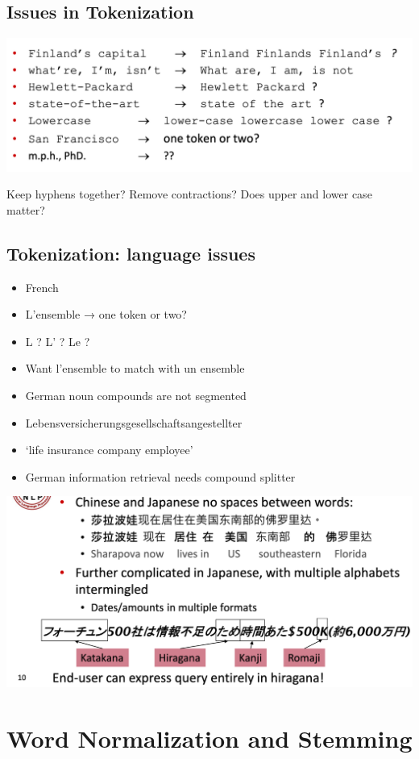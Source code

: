 \documentclass[11pt]{article}
\theoremstyle{definition}
\begin{document}
\subsection{Issues in Tokenization}

\includegraphics[width=\textwidth]{2.png}

Keep hyphens together? Remove contractions? Does upper and lower case matter?

\subsection{Tokenization: language issues}
\begin{itemize}
  \item French
  \item L'ensemble → one token or two?
  \item L ? L’ ? Le ?
  \item Want l’ensemble to match with un ensemble
  \item German noun compounds are not segmented
  \item Lebensversicherungsgesellschaftsangestellter
  \item ‘life insurance company employee’
  \item German information retrieval needs compound splitter
\end{itemize}

\includegraphics[width=\textwidth]{3.png}

\section{Word Normalization and
Stemming}
\end{document}

